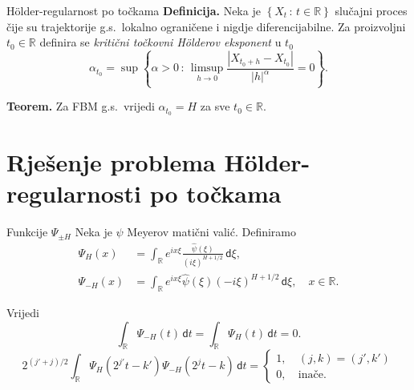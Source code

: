 \documentclass{beamer}
\renewcommand{\mathrm}[1]{\mathsf{#1}}
\newcommand{\st}{\, \colon \,}
\newcommand{\D}{\,\mathrm d}
\newcommand{\wh}[1]{\widehat{#1}}
\newcommand{\R}{\mathbb{R}}
\newcommand{\holder}{H\" older}
\newcommand{\abs}[1]{\left| {#1} \right|}
\begin{document}
\begin{frame}{\holder -regularnost po točkama}
\textbf{Definicija.}
Neka je \( \left\{ X_t \st t \in \R\right\} \) slučajni proces čije su trajektorije g.s.\
	lokalno ograničene i nigdje diferencijabilne. Za proizvoljni
	\( t_0 \in \R \) definira se \emph{kritični točkovni \holder ov eksponent} u \( t_0 \)
	\begin{equation}
		\alpha_{t_0} = \sup \left\{ \alpha > 0 \st
		\limsup\limits_{h \rightarrow 0} \frac{\abs{X_{t_0+h}-X_{t_0}}}{\abs h^\alpha} = 0
		\right\}.
	\end{equation}

\vskip20pt
\textbf{Teorem.} Za FBM g.s.\ vrijedi \( \alpha_{t_0} = H \) za sve \( t_0 \in \R \).

\end{frame}

\section{Rješenje problema \holder -regularnosti po točkama}
\begin{frame}{Funkcije \( \Psi_{\pm H} \)}
Neka je \( \psi \) Meyerov matični valić. Definiramo
\begin{align}
\Psi_H(x) &= \int_\R
e^{ix\xi} \frac{\wh \psi(\xi)}{(i\xi)^{H+1/2}} \D \xi, \\
\Psi_{-H}(x) &= \int_\R e^{ix\xi} \wh \psi(\xi)
(-i\xi)^{H+1/2} \D \xi, \quad x \in \R.
\end{align}

\vskip20pt
Vrijedi
		      \begin{equation}
			      \int_\R \Psi_{-H}(t) \D t = \int_\R \Psi_H(t) \D t = 0.
		      \end{equation}
              		      \begin{equation}\label{eq:intpsihpsi-h}
			      2^{(j'+j)/2}\int_\R \Psi_H(2^{j'}t-k')\Psi_{-H}(2^jt-k) \D t =
			      \begin{cases}
				      1, \  & (j,k)=(j',k') \\
				      0, \  & \text{inače}.
			      \end{cases}
		      \end{equation}
\end{frame}
\end{document}
